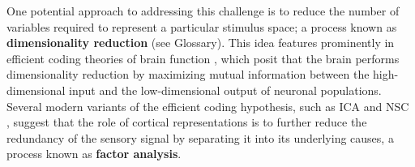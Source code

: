 One potential approach to addressing this challenge is to reduce the number
of variables required to represent a particular stimulus space;
a process known as \textbf{dimensionality reduction} (see Glossary).
This idea features prominently in 
efficient coding theories of brain function
\citep{Barlow1961,Barlow2001,Atick1992,Linsker1990},
which posit that the brain performs dimensionality reduction 
by maximizing mutual information between the
high-dimensional input and the low-dimensional output 
of neuronal populations.
Several modern variants of the efficient coding hypothesis,
such as \ac{ICA} \citep{BellSejnowski1997}
and \ac{NSC} \citep{Hoyer2002,Hoyer2004}, suggest that the role of cortical representations is to
further reduce the redundancy of the sensory signal 
by separating it into its underlying causes,
a process known as \textbf{factor analysis}.

